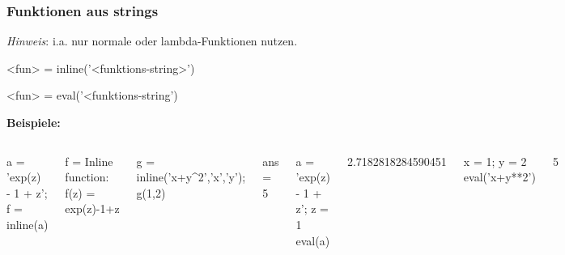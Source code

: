 \documentclass[hyperref={xetex}]{beamer}
\begin{document}
%
%
\begin{frame}[fragile]\frametitle{Funktionen aus strings}
  \textsl{Hinweis}: i.a. nur normale oder lambda-Funktionen nutzen.
\begin{matlabin}
<fun> = inline('<funktions-string>')
\end{matlabin}
\begin{pyin}
<fun> = eval('<funktions-string')
\end{pyin}

\textbf{Beispiele:} \\
\begin{columns}[t]
\begin{matlabin}
a = 'exp(z) - 1 + z'; 
f = inline(a)
\end{matlabin}
\begin{matlab}
f =  Inline function:
     f(z) = exp(z)-1+z
\end{matlab}
\begin{matlabin}
g = inline('x+y^2','x','y'); g(1,2)
\end{matlabin}
\begin{matlab}
ans = 5
\end{matlab}
\begin{pyin}
a = 'exp(z) - 1 + z';  z = 1
eval(a)
\end{pyin}
\begin{pyout}
2.7182818284590451  
\end{pyout}
\begin{pyin}
x = 1; y = 2
eval('x+y**2')
\end{pyin}
\begin{pyout}
5  
\end{pyout}
\end{columns}
\end{frame}
%
%
%
%
\end{document}
